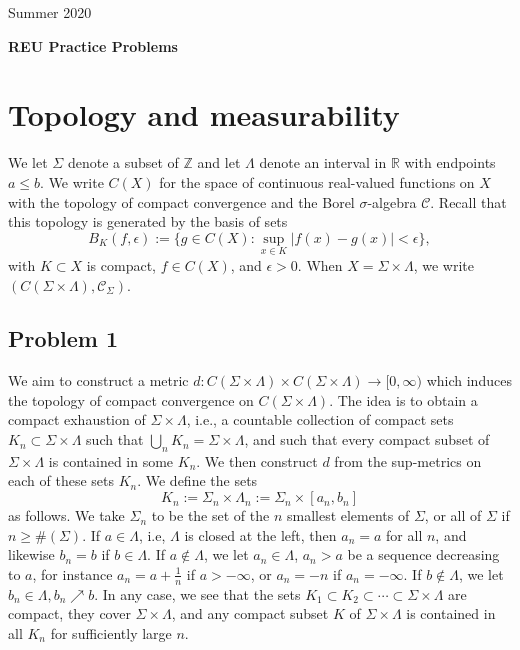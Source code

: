 \documentclass[12pt]{article}
\begin{document}
	\begin{flushright}
		Summer 2020
	\end{flushright}
	
	\begin{center}
		\LARGE\textbf{REU Practice Problems}
	\end{center}


\section{Topology and measurability}

	We let $\Sigma$ denote a subset of $\mathbb{Z}$ and let $\Lambda$  denote an interval in $\mathbb{R}$ with endpoints $a\leq b$. We write $C(X)$ for the space of continuous real-valued functions on $X$ with the topology of compact convergence and the Borel $\sigma$-algebra $\mathcal{C}$. Recall that this topology is generated by the basis of sets
	\[
	B_K(f,\epsilon) := \big\{g\in C(X):\sup_{x\in K} |f(x)-g(x)|<\epsilon\big\},
	\]
	with $K\subset X$ is compact, $f\in C(X)$, and $\epsilon>0$. When $X=\Sigma\times\Lambda$, we write $(C(\Sigma\times\Lambda),\mathcal{C}_\Sigma)$.

	\subsection*{Problem 1}
	
		We aim to construct a metric $d:C(\Sigma\times\Lambda)\times C(\Sigma\times\Lambda)\to [0,\infty)$ which induces the topology of compact convergence on $C(\Sigma\times\Lambda)$. The idea is to obtain a compact exhaustion of $\Sigma\times\Lambda$, i.e., a countable collection of compact sets $K_n\subset\Sigma\times\Lambda$ such that $\bigcup_n K_n = \Sigma\times\Lambda$, and such that every compact subset of $\Sigma\times\Lambda$ is contained in some $K_n$. We then construct $d$ from the sup-metrics on each of these sets $K_n$. We define the sets
		\[
		K_n := \Sigma_n \times \Lambda_n := \Sigma_n \times [a_n,b_n]
		\]
		as follows. We take $\Sigma_n$ to be the set of the $n$ smallest elements of $\Sigma$, or all of $\Sigma$ if $n\geq \#(\Sigma)$. If $a\in\Lambda$, i.e, $\Lambda$ is closed at the left, then $a_n=a$ for all $n$, and likewise $b_n=b$ if $b\in\Lambda$. If $a\notin\Lambda$, we let $a_n\in\Lambda$, $a_n>a$ be a sequence decreasing to $a$, for instance $a_n=a+\frac{1}{n}$ if $a>-\infty$, or $a_n=-n$ if $a_n=-\infty$. If $b\notin\Lambda$, we let $b_n\in\Lambda, b_n\nearrow b$. In any case, we see that the sets $K_1\subset K_2\subset\cdots\subset\Sigma\times\Lambda$ are compact, they cover $\Sigma\times\Lambda$, and any compact subset $K$ of $\Sigma\times\Lambda$ is contained in all $K_n$ for sufficiently large $n$.
		
\end{document}
